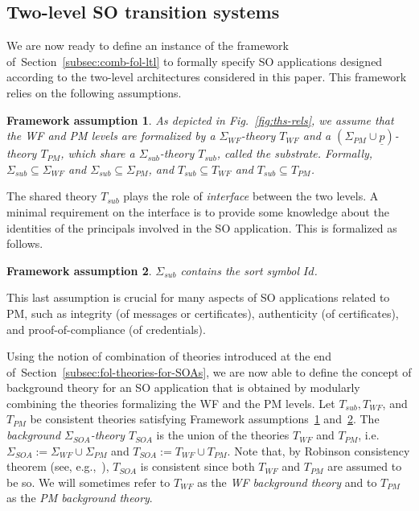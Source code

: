 \documentclass[conference]{IEEEtran}
\newtheorem{framework-assumption}{Framework assumption}
\newcommand{\close}{\IEEEQEDclosed}
\newcommand{\secref}[1]{Section~\ref{#1}}
\begin{document}
\subsection{Two-level SO transition systems}
We are now ready to define an instance of the framework
of~\secref{subsec:comb-fol-ltl} to formally specify SO
applications designed according to the two-level architectures
considered in this paper. This framework relies on the following assumptions.
\begin{framework-assumption}\label{framework-one}
  As depicted in Fig.~\ref{fig:ths-rels}, we assume that the WF and
  PM levels are formalized by a $\Sigma_\mathit{WF}$-theory
  $T_\mathit{WF}$ and a $(\Sigma_\mathit{PM}\cup
  \underline{p})$-theory $T_\mathit{PM}$, which share a
  $\Sigma_\mathit{sub}$-theory $T_\mathit{sub}$, called the
  \emph{substrate}. Formally, $\Sigma_\mathit{sub}\subseteq
  \Sigma_\mathit{WF}$ and $\Sigma_\mathit{sub}\subseteq
  \Sigma_\mathit{PM}$, and $T_\mathit{sub}\subseteq T_\mathit{WF}$ and
  $T_\mathit{sub}\subseteq T_\mathit{PM}$. \hfill \close
\end{framework-assumption}

The shared theory $T_\mathit{sub}$ plays the role of \emph{interface} between the
two levels.  A minimal requirement on the interface is to provide some
knowledge about the identities of the principals involved in the SO
application. This is formalized as follows.
\begin{framework-assumption}\label{framework-two}
  $\Sigma_\mathit{sub}$ contains the sort symbol $\mathit{Id}$. \hfill \close
\end{framework-assumption}

This last assumption is crucial for many aspects of SO applications
related to PM, such as integrity (of messages or certificates),
authenticity (of certificates), and proof-of-compliance (of
credentials).

Using the notion of combination of theories introduced at the end
of~\secref{subsec:fol-theories-for-SOAs}, we are now able to define
the concept of background theory for an SO application that is obtained by
modularly combining the theories formalizing the WF and the PM levels.
Let $T_\mathit{sub}, T_\mathit{WF}$, and $T_\mathit{PM}$ be consistent
theories satisfying Framework assumptions~\ref{framework-one}
and~\ref{framework-two}.  The \emph{background
  $\Sigma_\mathit{SOA}$-theory $T_\mathit{SOA}$} is the union of the
theories $T_\mathit{WF}$ and $T_\mathit{PM}$, i.e.\
$\Sigma_\mathit{SOA}:= \Sigma_\mathit{WF} \cup \Sigma_\mathit{PM}$
and $T_\mathit{SOA}:=T_\mathit{WF}\cup T_\mathit{PM}$.  Note that, by
Robinson consistency theorem (see, e.g.,~\cite{chang-kiesler}),
$T_\mathit{SOA}$ is consistent since both $T_\mathit{WF}$ and
$T_\mathit{PM}$ are assumed to be so.  We will sometimes refer to
$T_\mathit{WF}$ as the \emph{WF background theory} and to
$T_\mathit{PM}$ as the \emph{PM background theory}.
\end{document}
